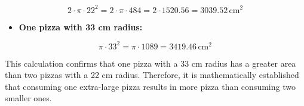 \documentclass[
  letterpaper,
  DIV=11,
  numbers=noendperiod]{scrartcl}
\providecommand{\tightlist}{%
  \setlength{\itemsep}{0pt}\setlength{\parskip}{0pt}}\usepackage{longtable,booktabs,array}
\begin{document}
\[
2 \cdot \pi \cdot 22^2 = 2 \cdot \pi \cdot 484 = 2 \cdot 1520.56 = 3039.52 \, \text{cm}^2
\]

\begin{itemize}
\tightlist
\item
  \textbf{One pizza with 33 cm radius:}
\end{itemize}

\[
\pi \cdot 33^2 = \pi \cdot 1089 = 3419.46 \, \text{cm}^2
\]

This calculation confirms that one pizza with a 33 cm radius has a
greater area than two pizzas with a 22 cm radius. Therefore, it is
mathematically established that consuming one extra-large pizza results
in more pizza than consuming two smaller ones.
\end{document}
